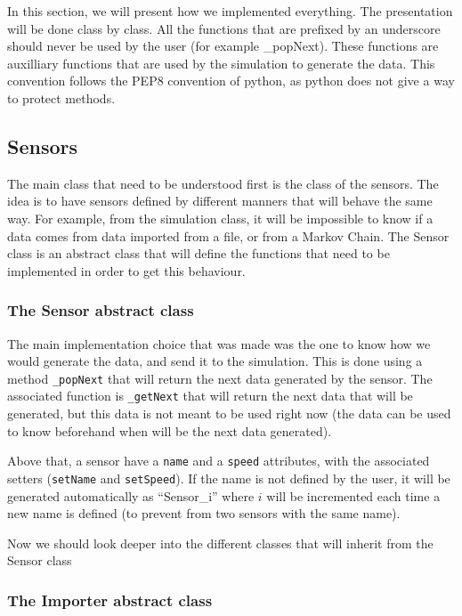 
In this section, we will present how we implemented everything. The presentation will be done class by class. All the functions that are prefixed by an underscore should never be used by the user (for example \_popNext). These functions are auxilliary functions that are used by the simulation to generate the data. This convention follows the PEP8 convention of python, as python does not give a way to protect methods.

\subsection{Sensors}

The main class that need to be understood first is the class of the sensors. The idea is to have sensors defined by different manners that will behave the same way. For example, from the simulation class, it will be impossible to know if a data comes from data imported from a file, or from a Markov Chain. The Sensor class is an abstract class that will define the functions that need to be implemented in order to get this behaviour.

\subsubsection{The Sensor abstract class}

The main implementation choice that was made was the one to know how we would generate the data, and send it to the simulation. This is done using a method \verb!_popNext! that will return the next data generated by the sensor. The associated function is \verb!_getNext! that will return the next data that will be generated, but this data is not meant to be used right now (the data can be used to know beforehand when will be the next data generated).

Above that, a sensor have a \verb!name! and a \verb!speed! attributes, with the associated setters (\verb!setName! and \verb!setSpeed!). If the name is not defined by the user, it will be generated automatically as ``Sensor\_i'' where $i$ will be incremented each time a new name is defined (to prevent from two sensors with the same name).

Now we should look deeper into the different classes that will inherit from the Sensor class

\subsubsection{The Importer abstract class}

